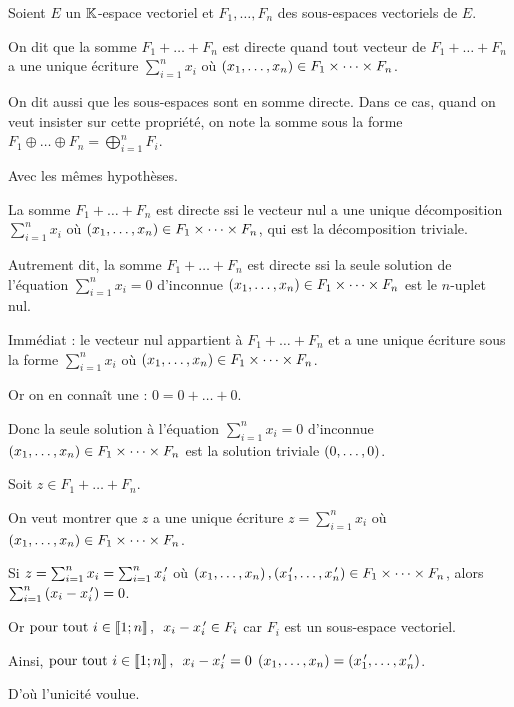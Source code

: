 \begin{defi}
Soient \(E\) un \(\mathbb{K}\)-espace vectoriel et \(F_1,\dots,F_n\) des sous-espaces vectoriels de \(E\).

On dit que la somme \(F_1+\dots+F_n\) est directe quand tout vecteur de \(F_1+\dots+F_n\) a une unique écriture \(\sum_{i=1}^nx_i\) où \(\left(x_1,\dots,x_n\right)\in F_1\times\dots\times F_n\).
\end{defi}

On dit aussi que les sous-espaces sont en somme directe. Dans ce cas, quand on veut insister sur cette propriété, on note la somme sous la forme \(F_1\oplus\dots\oplus F_n=\bigoplus_{i=1}^nF_i\).

\begin{prop}
Avec les mêmes hypothèses.

La somme \(F_1+\dots+F_n\) est directe ssi le vecteur nul a une unique décomposition \(\sum_{i=1}^nx_i\) où \(\left(x_1,\dots,x_n\right)\in F_1\times\dots\times F_n\), qui est la décomposition triviale.

Autrement dit, la somme \(F_1+\dots+F_n\) est directe ssi la seule solution de l'équation \(\sum_{i=1}^nx_i=0\) d'inconnue \(\left(x_1,\dots,x_n\right)\in F_1\times\dots\times F_n\) est le \(n\)-uplet nul.
\end{prop}

\begin{dem}
\impdir

Immédiat : le vecteur nul appartient à \(F_1+\dots+F_n\) et a une unique écriture sous la forme \(\sum_{i=1}^nx_i\) où \(\left(x_1,\dots,x_n\right)\in F_1\times\dots\times F_n\).

Or on en connaît une : \(0=0+\dots+0\).

Donc la seule solution à l'équation \(\sum_{i=1}^nx_i=0\) d'inconnue \(\left(x_1,\dots,x_n\right)\in F_1\times\dots\times F_n\) est la solution triviale \(\left(0,\dots,0\right)\).

\imprec

Soit \(z\in F_1+\dots+F_n\).

On veut montrer que \(z\) a une unique écriture \(z=\sum_{i=1}^nx_i\) où \(\left(x_1,\dots,x_n\right)\in F_1\times\dots\times F_n\).

Si \(z=\sum_{i=1}^nx_i=\sum_{i=1}^nx_i^{\,\prime}\) où \(\left(x_1,\dots,x_n\right),\left(x_1^{\,\prime},\dots,x_n^{\,\prime}\right)\in F_1\times\dots\times F_n\), alors \(\sum_{i=1}^n\left(x_i-x_i^{\,\prime}\right)=0\).

Or \(\quantifs{\tpt i\in\interventierii{1}{n}}x_i-x_i\prim\in F_i\) car \(F_i\) est un sous-espace vectoriel.

Ainsi, \(\quantifs{\tpt i\in\interventierii{1}{n}}x_i-x_i\prim=0\) \ie \(\left(x_1,\dots,x_n\right)=\left(x_1^{\,\prime},\dots,x_n^{\,\prime}\right)\).

D'où l'unicité voulue.
\end{dem}

